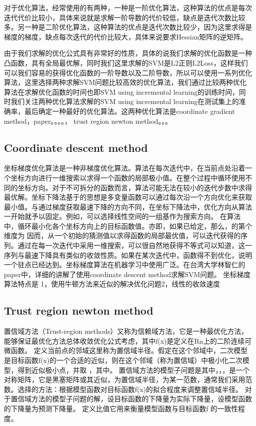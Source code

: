 \documentclass[master]{njuthesis}
\begin{document}
    对于优化算法，经常使用的有两种，一种是一阶优化算法，这种算法的优点是每次迭代代价比较小，具体来说就是求解一阶导数的代价较低，缺点是迭代次数比较多。另一种是二阶优化算法，这种算法的优点是迭代次数比较少，因为这里求得是梯度的梯度，缺点每次迭代的代价比较大，具体来说要求Hessian矩阵的逆矩阵。
    
    由于我们求解的优化公式具有非常好的性质，具体的说我们求解的优化函数是一种凸函数，具有全局最优解，同时我们这里求解的SVM是L2正则L2Loss，这样我们可以我们容易的获得优化函数的一阶导数以及二阶导数，所以可以使用一系列优化算法，这里选择两种求解SVM问题比较高效的优化算法，我们通过比较两种优化算法在求解优化函数的时间也即SVM using incremental learning的训练时间，同时我们关注两种优化算法求解的SVM using incremental learning在测试集上的准确率，最后确定一种最好的优化算法。这两种优化算法是coordinate gradient method，paper。。。。， trust region newton method。。。

\subsection{Coordinate descent method}

    坐标梯度优化算法是一种非梯度优化算法。算法在每次迭代中，在当前点处沿着一个坐标方向进行一维搜索以求得一个函数的局部极小值。在整个过程中循环使用不同的坐标方向。对于不可拆分的函数而言，算法可能无法在较小的迭代步数中求得最优解。坐标下降法基于的思想是多变量函数可以通过每次沿一个方向优化来获取最小值。与通过梯度获取最速下降的方向不同，在坐标下降法中，优化方向从算法一开始就予以固定。例如，可以选择线性空间的一组基作为搜索方向。 在算法中，循环最小化各个坐标方向上的目标函数值。亦即，如果已给定，那么，的第个维度为
   因而，从一个初始的猜测值以求得函数的局部最优值，可以迭代获得的序列。通过在每一次迭代中采用一维搜索，可以很自然地获得不等式可以知道，这一序列与最速下降具有类似的收敛性质。如果在某次迭代中，函数得不到优化，说明一个驻点已经达到。坐标梯度算法在机器学习中使用广泛。在台湾大学林智仁的paper中，详细的讲解了使用coordinate descent method求解SVM问题。
    坐标梯度算法特点是 1，使用牛顿方法来近似的解决优化问题2，线性的收敛速度

\subsection{Trust region newton method}

    置信域方法（Trust-region methods）又称为信赖域方法，它是一种最优化方法，能够保证最优化方法总体收敛优化公式考虑，其中ƒ(x)是定义在Rn上的二阶连续可微函数。 定义当前点的邻域这里称为置信域半径。假定在这个邻域中，二次模型是目标函数ƒ(x)的一个合适的近似，则在这个邻域（称为置信域）中极小化二次模型，得到近似极小点，并取 ，其中。
    置信域方法的模型子问题是其中，，，是一个对称矩阵，它是黑塞矩阵或其近似，为置信域半径，为某一范数，通常我们采用范数。选择的方法：根据模型函数对目标函数ƒ(x)的拟合程度来调整置信域半径。 对于置信域方法的模型子问题的解，设目标函数的下降量为实际下降量，设模型函数的下降量为预测下降量。 定义比值它用来衡量模型函数与目标函数ƒ 的一致性程度。
\end{document}
